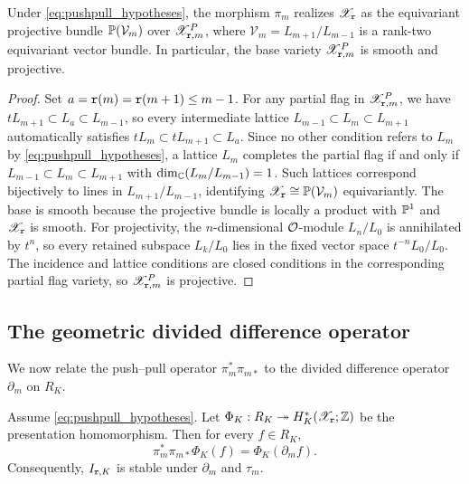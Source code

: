 \begin{proposition}\label{prop:pushpull_projective_bundle}
Under \eqref{eq:pushpull_hypotheses}, the morphism $\pi_m$ realizes $\mathscr X_{\mathtt r}$ as the
equivariant projective bundle $\mathbb P(\mathcal V_m)$ over $\mathscr X_{\mathtt r,m}^P$, where
$\mathcal V_m=L_{m+1}/L_{m-1}$ is a rank-two equivariant vector bundle.
In particular, the base variety $\mathscr X_{\mathtt r,m}^P$ is smooth and projective.
\end{proposition}

\begin{proof}
Set $a=\mathtt r(m)=\mathtt r(m+1)\leq m-1$. For any partial flag in $\mathscr X_{\mathtt r,m}^P$,
we have $tL_{m+1}\subset L_a\subset L_{m-1}$, so every intermediate lattice
$L_{m-1}\subset L_m\subset L_{m+1}$ automatically satisfies $tL_m\subset tL_{m+1}\subset L_a$.
Since no other condition refers to $L_m$ by \eqref{eq:pushpull_hypotheses},
a lattice $L_m$ completes the partial flag if and only if $L_{m-1}\subset L_m\subset L_{m+1}$ with $\dim_\mathbb C(L_m/L_{m-1})=1$.
Such lattices correspond bijectively to lines in $L_{m+1}/L_{m-1}$,
identifying $\mathscr X_{\mathtt r}\cong\mathbb P(\mathcal V_m)$ equivariantly.
The base is smooth because the projective bundle is locally a product with $\mathbb P^1$
and $\mathscr X_{\mathtt r}$ is smooth.
For projectivity, the $n$-dimensional $\mathcal O$-module $L_n/L_0$ is annihilated by $t^n$,
so every retained subspace $L_k/L_0$ lies in the fixed vector space $t^{-n}L_0/L_0$.
The incidence and lattice conditions are closed conditions in the corresponding
partial flag variety, so $\mathscr X_{\mathtt r,m}^P$ is projective.
\end{proof}

\subsection{The geometric divided difference operator}

We now relate the push--pull operator $\pi_m^*\pi_{m*}$ to the divided difference
operator $\partial_m$ on $R_K$.

\begin{theorem}\label{thm:pushpull_divided_difference}
Assume \eqref{eq:pushpull_hypotheses}.
Let $\Phi_K:R_K\twoheadrightarrow H_K^*(\mathscr X_{\mathtt r};\mathbb Z)$ be the presentation homomorphism.
Then for every $f\in R_K$,
\[
  \pi_m^*\pi_{m*}\Phi_K(f)=\Phi_K(\partial_m f).
\]
Consequently, $I_{\mathtt r,K}$ is stable under $\partial_m$ and $\tau_m$.
\end{theorem}

